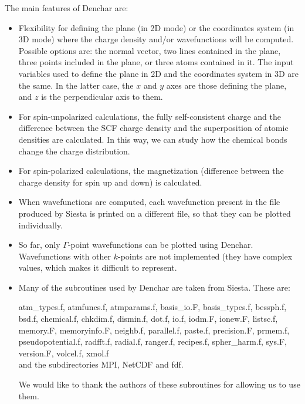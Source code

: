 The main features of {\sc Denchar} are:
\begin{itemize}

\item
Flexibility for defining the plane (in 2D mode) or the
coordinates system (in 3D mode) where the charge density and/or
wavefunctions will be computed.
Possible options are: the normal vector, 
two lines contained in the plane,
three points included in the plane,
or three atoms contained in it.
The input variables used to define the plane in 2D and the
coordinates system in 3D are the same. In the latter case, the
$x$ and $y$ axes are those defining the plane, and $z$ is
the perpendicular axis to them.

\item
For spin-unpolarized calculations, the fully self-consistent charge and
the difference between the SCF charge density and the superposition of atomic
densities are calculated. In this way, we can study how the chemical bonds 
change the charge distribution.
 
\item
For spin-polarized calculations, the magnetization (difference between
the charge density for spin up and down) is calculated.

\item
When wavefunctions are computed, each wavefunction present in the
file produced by {\sc Siesta} is printed on a different file, 
so that they can be plotted individually.

\item
So far, only $\Gamma$-point wavefunctions  can be plotted
using {\sc Denchar}. Wavefunctions with other $k$-points
are not implemented (they have complex values, which
makes it difficult to represent.

\item 
Many of the subroutines used by {\sc Denchar} 
are taken from {\sc Siesta}. These are:

atm\_types.f, atmfuncs.f, atmparams.f, basis\_io.F, basis\_types.f, 
bessph.f, bsd.f, chemical.f, chkdim.f, dismin.f, dot.f, io.f, iodm.F, 
ionew.F, listsc.f, memory.F, memoryinfo.F, neighb.f, 
parallel.f, paste.f, precision.F, prmem.f, pseudopotential.f,
radfft.f, radial.f, ranger.f, recipes.f, spher\_harm.f, sys.F, 
version.F, volcel.f, xmol.f \\
 
and the subdirectories MPI, NetCDF and fdf.
 
We would like to thank the authors of these subroutines
for allowing us to use them.


\end{itemize}

